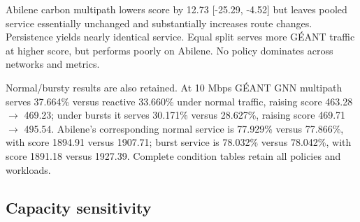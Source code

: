 \documentclass[conference,letterpaper]{IEEEtran}
\begin{document}
Abilene carbon multipath lowers score by 12.73 [-25.29, -4.52] but leaves pooled service essentially unchanged and substantially increases route changes. Persistence yields nearly identical service. Equal split serves more GÉANT traffic at higher score, but performs poorly on Abilene. No policy dominates across networks and metrics.

Normal/bursty results are also retained. At 10 Mbps GÉANT GNN multipath serves 37.664\% versus reactive 33.660\% under normal traffic, raising score 463.28 $\rightarrow$ 469.23; under bursts it serves 30.171\% versus 28.627\%, raising score 469.71 $\rightarrow$ 495.54. Abilene's corresponding normal service is 77.929\% versus 77.866\%, with score 1894.91 versus 1907.71; burst service is 78.032\% versus 78.042\%, with score 1891.18 versus 1927.39. Complete condition tables retain all policies and workloads.

\subsection{Capacity sensitivity}
\end{document}
